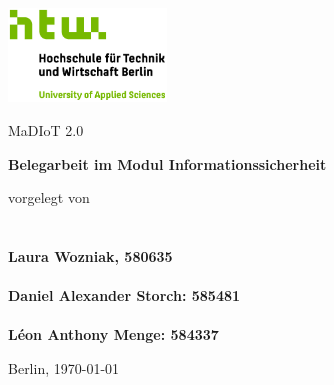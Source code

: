 \documentclass[
    a4paper,
    pagesize,
	pdftex,
    12pt,
]{scrartcl}
\begin{document}
\begin{titlepage}
    \begin{center}
        \includegraphics[height=25mm]{S04_HTW_Berlin_Logo_pos_FARBIG_RGB.jpg} \\
        \vspace{1.0cm}

        MaDIoT 2.0
    
        \vspace{1.5cm}   

        \textbf{Belegarbeit im Modul Informationssicherheit}

        \vspace{1.5cm}

        vorgelegt von \\
        \textbf{
        \\ \\
        Laura Wozniak, 580635\\ \\
        Daniel Alexander Storch: 585481\\ \\
        Léon Anthony Menge: 584337
        }%

        \vspace{1.5cm}    
        Berlin, \today\\
    \end{center}
\end{titlepage}


\thispagestyle{empty}
\tableofcontents
\newpage
\end{document}

